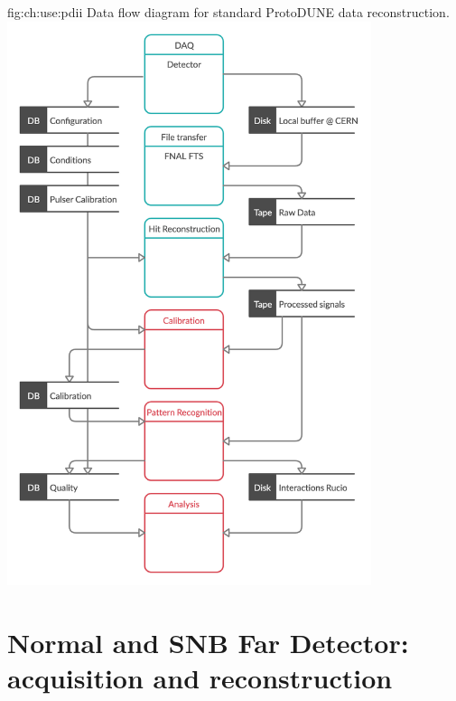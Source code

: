 \documentclass[../main-00.tex]{subfiles}
\begin{document}
\begin{dunefigure}
{fig:ch:use:pdii}
{Data flow diagram for standard ProtoDUNE data reconstruction.}
\includegraphics[width=0.8\textwidth]{graphics/IntroFigures/DataProcessingPDv1.png}
\end{dunefigure}
\pagebreak




\section{Normal  and SNB Far Detector: acquisition and reconstruction}
\label{sec:use:fdbeam}  %
\end{document}

